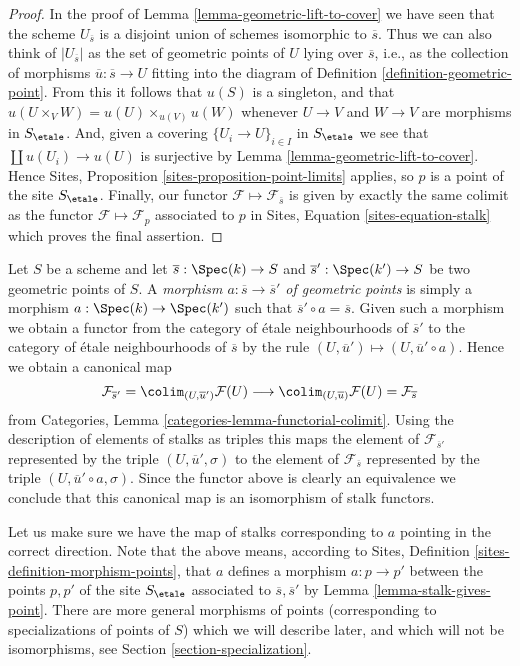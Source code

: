 \begin{proof}
In the proof of
Lemma \ref{lemma-geometric-lift-to-cover}
we have seen that the scheme $U_{\overline{s}}$ is a disjoint union of
schemes isomorphic to $\overline{s}$. Thus we can also think of
$|U_{\overline{s}}|$ as the set of geometric points of $U$ lying over
$\overline{s}$, i.e., as the collection of morphisms
$\overline{u} : \overline{s} \to U$ fitting into the diagram of
Definition \ref{definition-geometric-point}.
From this it follows that $u(S)$ is a singleton, and that
$u(U \times_V W) = u(U) \times_{u(V)} u(W)$
whenever $U \to V$ and $W \to V$ are morphisms in $S_\etale$.
And, given a covering $\{U_i \to U\}_{i \in I}$ in $S_\etale$
we see that $\coprod u(U_i) \to u(U)$ is surjective by
Lemma \ref{lemma-geometric-lift-to-cover}.
Hence
Sites, Proposition \ref{sites-proposition-point-limits}
applies, so $p$ is a point of the site $S_\etale$.
Finally, our functor $\mathcal{F} \mapsto \mathcal{F}_{\overline{s}}$
is given by exactly the same colimit as the functor
$\mathcal{F} \mapsto \mathcal{F}_p$ associated to $p$ in
Sites, Equation \ref{sites-equation-stalk}
which proves the final assertion.
\end{proof}

\begin{remark}
\label{remark-map-stalks}
Let $S$ be a scheme and let $\overline{s} : \Spec(k) \to S$
and $\overline{s}' : \Spec(k') \to S$ be two geometric points of
$S$. A {\it morphism $a : \overline{s} \to \overline{s}'$ of geometric points}
is simply a morphism $a : \Spec(k) \to \Spec(k')$ such that
$\overline{s}' \circ a = \overline{s}$. Given such a morphism we obtain
a functor from the category of \'etale neighbourhoods of $\overline{s}'$
to the category of \'etale neighbourhoods of $\overline{s}$ by the rule
$(U, \overline{u}') \mapsto (U, \overline{u}' \circ a)$. Hence we obtain
a canonical map
$$
\mathcal{F}_{\overline{s}'}
=
\colim_{(U, \overline{u}')} \mathcal{F}(U)
\longrightarrow
\colim_{(U, \overline{u})} \mathcal{F}(U)
=
\mathcal{F}_{\overline{s}}
$$
from Categories, Lemma \ref{categories-lemma-functorial-colimit}. Using the
description of elements of stalks as triples this maps the element of
$\mathcal{F}_{\overline{s}'}$ represented by the triple
$(U, \overline{u}', \sigma)$ to the element of $\mathcal{F}_{\overline{s}}$
represented by the triple $(U, \overline{u}' \circ a, \sigma)$.
Since the functor above is clearly an equivalence we conclude that this
canonical map is an isomorphism of stalk functors.

\medskip\noindent
Let us make sure we have the map of stalks corresponding to $a$ pointing
in the correct direction. Note that the above means, according to
Sites, Definition \ref{sites-definition-morphism-points},
that $a$ defines a morphism $a : p \to p'$ between the points $p, p'$ of
the site $S_\etale$ associated to $\overline{s}, \overline{s}'$ by
Lemma \ref{lemma-stalk-gives-point}. There are more general morphisms of
points (corresponding to specializations of points of $S$) which we will
describe later, and which will not be isomorphisms, see Section
\ref{section-specialization}.
\end{remark}

